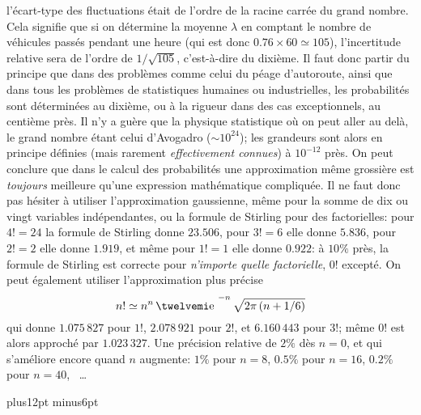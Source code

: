 l'\'ecart-type des fluctuations \'etait de l'ordre de la racine carr\'ee  
du grand nombre.  Cela signifie que si on d\'etermine la moyenne 
$\lambda$ en comptant le nombre de v\'ehicules pass\'es pendant une 
heure (qui est donc $0.76 \times 60 \simeq105$),  l'incertitude relative 
sera de l'ordre de $1 / \sqrt{105}$,  c'est-\`a-dire du dixi\`eme. 
\medskip  
Il faut donc partir du principe que dans des probl\`emes comme celui du 
p\'eage d'autoroute,  ainsi que dans tous les probl\`emes de statistiques 
humaines ou industrielles,  les probabilit\'es sont d\'etermin\'ees au 
dixi\`eme,  ou \`a la rigueur dans des cas exceptionnels,  au centi\`eme 
pr\`es.  Il n'y a gu\`ere que la physique statistique o\`u on peut aller au 
del\`a,  le grand nombre \'etant celui d'Avogadro ($\sim 10^{24}$);  les 
grandeurs sont alors en principe d\'efinies (mais rarement {\it 
effectivement connues}) \`a $10^{-12}$ pr\`es.   
\medskip 
On peut conclure que dans le calcul des probabilit\'es une approximation 
m\^eme grossi\`ere est {\it toujours} meilleure qu'une expression 
math\'ematique compliqu\'ee.  Il ne faut donc pas h\'esiter \`a utiliser 
l'approximation gaus\-sienne,  m\^eme pour la somme de dix ou vingt 
variables ind\'ependantes,  ou la formule de Stirling pour des factorielles: 
pour $4! = 24$ la formule de Stirling donne $23.506$,  pour $3! = 6$ elle
donne $5.836$,  pour $2! = 2$ elle donne $1.919$,  et m\^eme pour $1! = 1$
elle donne $0.922$:  \`a $10\%$ pr\`es,  la formule de Stirling est correcte
pour {\it n'importe quelle factorielle},  $0!$ except\'e. 
\medskip
On peut \'egalement utiliser l'approximation plus pr\'ecise
$$n! \simeq n^n\, \e^{-n}\, \sqrt{2\pi\, (n + 1/6)}$$
qui donne $1.075\, 827$ pour $1!$,  $2.078\, 921$ pour $2!$, 
et $6.160\, 443$ pour $3!$;  m\^eme $0!$ est alors approch\'e par
$1.023\, 327$.  Une pr\'ecision relative de $2\%$ d\`es $n=0$, 
et qui s'am\'eliore encore quand $n$ augmente: \hskip7pt $1\%$ pour
$n=8$,\hskip10pt $0.5\%$ pour $n=16$,\hskip10pt $0.2\%$ pour $n=40$, \ \dots

\vskip14pt plus12pt minus6pt
 
